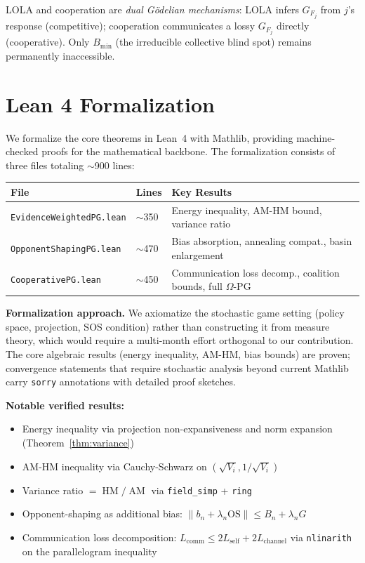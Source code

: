 \documentclass[11pt,a4paper]{article}
\DeclareMathOperator{\AM}{AM}
\DeclareMathOperator{\HM}{HM}
\newcommand{\norm}[1]{\|#1\|}
\begin{document}
LOLA and cooperation are \emph{dual G\"odelian mechanisms}: LOLA infers
$G_{F_j}$ from $j$'s response (competitive); cooperation communicates
a lossy $G_{F_j}$ directly (cooperative). Only $B_{\min}$ (the irreducible
collective blind spot) remains permanently inaccessible.


\section{Lean 4 Formalization}\label{sec:lean}

We formalize the core theorems in Lean~4 with Mathlib, providing
machine-checked proofs for the mathematical backbone. The formalization
consists of three files totaling $\sim$900 lines:

\begin{center}
\begin{tabular}{lll}
\toprule
\textbf{File} & \textbf{Lines} & \textbf{Key Results} \\
\midrule
\texttt{EvidenceWeightedPG.lean} & $\sim$350 &
    Energy inequality, AM-HM bound, variance ratio \\
\texttt{OpponentShapingPG.lean} & $\sim$470 &
    Bias absorption, annealing compat., basin enlargement \\
\texttt{CooperativePG.lean} & $\sim$450 &
    Communication loss decomp., coalition bounds, full $\Omega$-PG \\
\bottomrule
\end{tabular}
\end{center}

\textbf{Formalization approach.}
We axiomatize the stochastic game setting (policy space, projection,
SOS condition) rather than constructing it from measure theory, which
would require a multi-month effort orthogonal to our contribution.
The core algebraic results (energy inequality, AM-HM, bias bounds)
are proven; convergence statements that require stochastic analysis
beyond current Mathlib carry \texttt{sorry} annotations with detailed
proof sketches.

\textbf{Notable verified results:}
\begin{itemize}
    \item Energy inequality via projection non-expansiveness and
    norm expansion (Theorem~\ref{thm:variance})
    \item AM-HM inequality via Cauchy-Schwarz on $(\sqrt{V_i}, 1/\sqrt{V_i})$
    \item Variance ratio $= \HM/\AM$ via \texttt{field\_simp} + \texttt{ring}
    \item Opponent-shaping as additional bias:
    $\norm{b_n + \lambda_n \text{OS}} \leq B_n + \lambda_n G$
    \item Communication loss decomposition:
    $L_{\text{comm}} \leq 2L_{\text{self}} + 2L_{\text{channel}}$
    via \texttt{nlinarith} on the parallelogram inequality
\end{itemize}
\end{document}
